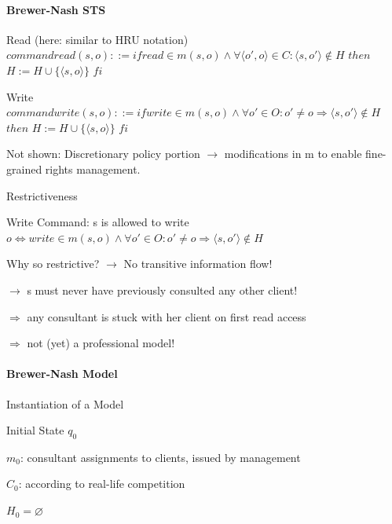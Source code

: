 \documentclass[a4paper]{article}
\begin{document}
\begin{multicols}{3}
    \paragraph{Brewer-Nash STS}
    \begin{itemize*}
        \item Read (here: similar to HRU notation)
        $command read(s,o)::=if read \in m(s,o) \wedge\forall ⟨o',o⟩\in C:⟨s,o'⟩\not\in H$
        $then$
        $H:=H\cup\{⟨s,o⟩\}$
        $fi$
        \item Write
        $command write(s,o)::=if write \in m(s,o) \wedge\forall o'\in O:o'\not=o \Rightarrow ⟨s,o'⟩\not\in H$
        $then$
        $H:=H\cup\{⟨s,o⟩\}$
        $fi$
    \end{itemize*}

    Not shown: Discretionary policy portion $\rightarrow$ modifications in m to enable fine-grained rights management.

    Restrictiveness
    \begin{itemize*}
        \item Write Command: s is allowed to write $o\Leftrightarrow write\in m(s,o)\wedge\forall o'\in O:o'\not=o\Rightarrow⟨s,o'⟩\not\in H$
        \item Why so restrictive? $\rightarrow$ No transitive information flow!
        \begin{itemize*}
            \item $\rightarrow$ s must never have previously consulted any other client!
            \item $\Rightarrow$ any consultant is stuck with her client on first read access
            \item $\Rightarrow$ not (yet) a professional model!
        \end{itemize*}
    \end{itemize*}

    \paragraph{Brewer-Nash Model}
    Instantiation of a Model
    \begin{itemize*}
        \item Initial State $q_0$
        \begin{itemize*}
            \item $m_0$: consultant assignments to clients, issued by management
            \item $C_0$: according to real-life competition
            \item $H_0 =\varnothing$
        \end{itemize*}
    \end{itemize*}


\end{multicols}
\end{document}

